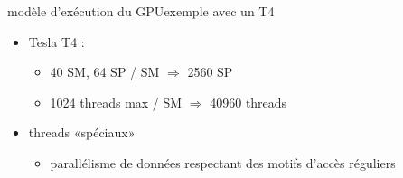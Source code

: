 \documentclass[11pt,mathserif]{beamer}
\begin{document}
\begin{frame}{modèle d'exécution du GPU}{exemple avec un T4}
\begin{minipage}[c]{0.69\linewidth}
  \begin{itemize}[<+->]
    \item Tesla T4 : 
      \begin{itemize}
        \item 40 SM, 64 SP / SM $\Rightarrow$ 2560 SP
        \item 1024 threads max / SM $\Rightarrow$ 40960 threads
      \end{itemize}
    \item threads «spéciaux»
      \begin{itemize}
        \item parallélisme de données respectant des motifs d'accès réguliers
      \end{itemize}
  \end{itemize}
\end{minipage}
\begin{minipage}[c]{0.29\linewidth}
\begin{center}
\end{center}
\end{minipage}
\end{frame}
\end{document}
